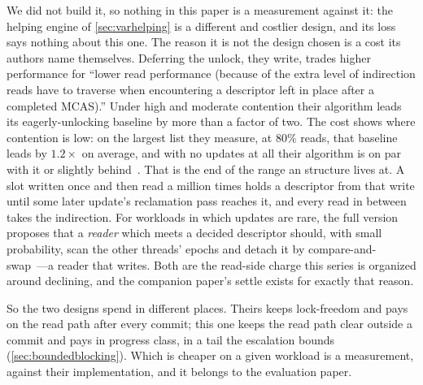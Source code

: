 \documentclass[11pt]{article}
\begin{document}
We did not build it, so nothing in this paper is a measurement against it: the
helping engine of \cref{sec:varhelping} is a different and costlier design, and
its loss says nothing about this one. The reason it is not the design chosen is
a cost its authors name themselves. Deferring the unlock, they write, trades
higher \mcas performance for ``lower read performance (because of the extra
level of indirection reads have to traverse when encountering a descriptor left
in place after a completed MCAS).'' Under high and moderate contention their
algorithm leads its eagerly-unlocking baseline by more than a factor of two.
The cost shows where contention is low: on the largest list they measure, at
$80\%$ reads, that baseline leads by $1.2\times$ on average, and with no updates
at all their algorithm is on par with it or slightly
behind~\citep[Appendix~A.7]{guerraoui2020mcasfull}. That is the end of the range
an \rcu structure lives at. A slot written once and then read a million times
holds a descriptor from that write until some later update's reclamation pass
reaches it, and every read in between takes the indirection. For workloads in
which updates are rare, the full version proposes that a \emph{reader} which
meets a decided descriptor should, with small probability, scan the other
threads' epochs and detach it by
compare-and-swap~\citep[Appendix~A.6]{guerraoui2020mcasfull}---a reader that
writes. Both are the read-side charge this series is organized around
declining, and the companion paper's settle exists for exactly that reason.

So the two designs spend in different places. Theirs keeps lock-freedom and pays
on the read path after every commit; this one keeps the read path clear outside
a commit and pays in progress class, in a tail the escalation bounds
(\cref{sec:boundedblocking}). Which is cheaper on a given workload is a
measurement, against their implementation, and it belongs to the evaluation
paper.
\end{document}
